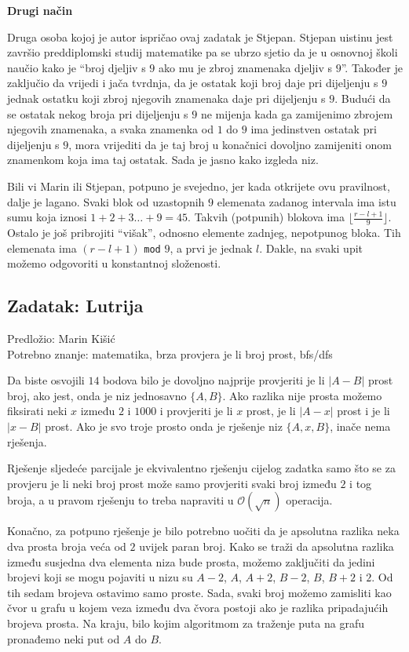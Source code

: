 \documentclass[a4paper]{article}
\begin{document}
\textbf{Drugi način}

Druga osoba kojoj je autor ispričao ovaj zadatak je Stjepan. Stjepan uistinu
jest završio preddiplomski studij matematike pa se ubrzo sjetio da je u osnovnoj
školi naučio kako je ``broj djeljiv s $9$ ako mu je zbroj znamenaka djeljiv s $9$''.
Također je zaključio da vrijedi i jača tvrdnja, da je ostatak koji broj daje pri
dijeljenju s $9$ jednak ostatku koji zbroj njegovih znamenaka daje pri
dijeljenju s $9$. Budući da se ostatak nekog broja pri dijeljenju s $9$ ne
mijenja kada ga zamijenimo zbrojem njegovih znamenaka, a svaka znamenka od $1$
do $9$ ima jedinstven ostatak pri dijeljenju s $9$, mora vrijediti da je taj
broj u konačnici dovoljno zamijeniti onom znamenkom koja ima taj ostatak.
Sada je jasno kako izgleda niz.

Bili vi Marin ili Stjepan, potpuno je svejedno, jer kada otkrijete ovu
pravilnost, dalje je lagano. Svaki blok od uzastopnih $9$ elemenata zadanog
intervala ima istu sumu koja iznosi $1 + 2 + 3 \dots + 9 = 45$. Takvih
(potpunih) blokova ima $\lfloor \frac{r - l + 1}{9} \rfloor$. Ostalo je još
pribrojiti ``višak'', odnosno elemente zadnjeg, nepotpunog bloka. Tih elemenata
ima $(r - l + 1)$ \texttt{mod} $9$,  a prvi je jednak $l$. Dakle, na svaki upit
možemo odgovoriti u konstantnoj složenosti.

\clearpage

\subsection*{Zadatak: Lutrija}
\textsf{Predložio: Marin Kišić}\\
\textsf{Potrebno znanje: matematika, brza provjera je li broj prost, bfs/dfs}

Da biste osvojili $14$ bodova bilo je dovoljno najprije provjeriti je li $|A-B|$
prost broj, ako jest, onda je niz jednosavno $\{A, B\}$. Ako razlika nije prosta
možemo fiksirati neki $x$ između $2$ i $1000$ i provjeriti je li $x$ prost, je
li $|A-x|$ prost i je li $|x-B|$ prost. Ako je svo troje prosto onda je rješenje
niz $\{A, x, B\}$, inače nema rješenja.

Rješenje sljedeće parcijale je ekvivalentno rješenju cijelog zadatka samo što se
za provjeru je li neki broj prost može samo provjeriti svaki broj između $2$ i
tog broja, a u pravom rješenju to treba napraviti u $\mathcal{O}(\sqrt n)$
operacija.

Konačno, za potpuno rješenje je bilo potrebno uočiti da je apsolutna razlika
neka dva prosta broja veća od $2$ uvijek paran broj. Kako se traži da apsolutna
razlika između susjedna dva elementa niza bude prosta, možemo zaključiti da
jedini brojevi koji se mogu pojaviti u nizu su $A-2$, $A$, $A+2$, $B-2$, $B$,
$B+2$ i $2$. Od tih sedam brojeva ostavimo samo proste. Sada, svaki broj možemo
zamisliti kao čvor u grafu u kojem veza između dva čvora postoji ako je razlika
pripadajućih brojeva prosta. Na kraju, bilo kojim algoritmom za traženje puta na
grafu pronađemo neki put od $A$ do $B$.
\end{document}
